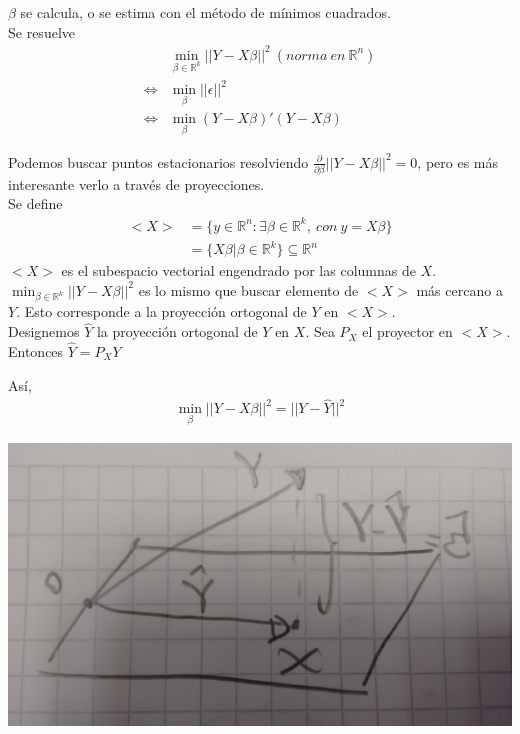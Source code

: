 \documentclass[10pt]{article}
\theoremstyle{plain}
\theoremstyle{definition}
\begin{document}
$\beta$ se calcula, o se estima con el método de mínimos cuadrados.\\

Se resuelve
\begin{align*}
& \min_{\beta \in \mathbb{R}^k} ||Y-X\beta||^2\ (norma\ en\ \mathbb{R}^n)\\
\Leftrightarrow & \min_{\beta} ||\epsilon||^2\\
\Leftrightarrow & \min_{\beta} (Y-X\beta)'(Y-X\beta)
\end{align*}

Podemos buscar puntos estacionarios resolviendo $\frac{\partial}{\partial \beta} ||Y-X\beta||^2 = 0$, pero es más interesante verlo a través de proyecciones.\\

Se define
\begin{align*}
<X> &= \{y \in \mathbb{R}^n\colon \exists \beta \in \mathbb{R}^k,\ con\ y=X\beta\}\\
&= \{X\beta | \beta \in \mathbb{R}^k\} \subseteq \mathbb{R}^n
\end{align*}
$<X>$ es el subespacio vectorial engendrado por las columnas de $X$.\\

$\min_{\beta \in \mathbb{R}^k} ||Y-X\beta||^2$ es lo mismo que buscar elemento de $<X>$ más cercano a $Y$. Esto corresponde a la proyección ortogonal de $Y$ en $<X>$.\\

Designemos $\hat{Y}$ la proyección ortogonal de $Y$ en $X$. Sea $P_{X}$ el proyector en $<X>$. Entonces $\hat{Y} = P_{X}Y$

Así,
\begin{align*}
\min_{\beta} ||Y-X\beta||^2 = ||Y-\hat{Y}||^2
\end{align*}

\begin{center}
\includegraphics[scale=0.1]{imagenes/proyeccion.jpg}
\end{center}
\end{document}

